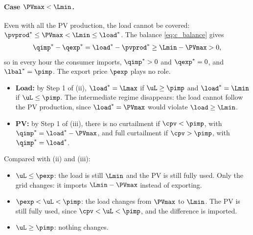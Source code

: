 \paragraph{Case $\PVmax < \Lmin$.}
Even with all the PV production, the load cannot be covered: ${\pvprod}^* \leq \PVmax < \Lmin
\leq {\load}^*$. The balance \eqref{eq:c_balance} gives
\begin{equation}
    {\qimp}^* - {\qexp}^* = {\load}^* - {\pvprod}^* \geq \Lmin - \PVmax > 0,
\end{equation}
so in every hour the consumer imports, ${\qimp}^* > 0$ and ${\qexp}^* = 0$, and
${\lbal}^* = \pimp$. The export price $\pexp$ plays no role.
\begin{itemize}
    \item \textbf{Load:} by Step 1 of (ii), ${\load}^* = \Lmax$ if $\uL \geq \pimp$ and
    ${\load}^* = \Lmin$ if $\uL \leq \pimp$. The intermediate regime disappears: the load
    cannot follow the PV production, since ${\load}^* = \PVmax$ would violate $\load \geq \Lmin$.
    \item \textbf{PV:} by Step 1 of (iii), there is no curtailment if $\cpv < \pimp$, with
    ${\qimp}^* = {\load}^* - \PVmax$, and full curtailment if $\cpv > \pimp$, with
    ${\qimp}^* = {\load}^*$.
\end{itemize}
Compared with (ii) and (iii):
\begin{itemize}
    \item $\uL \leq \pexp$: the load is still $\Lmin$ and the PV is still fully used. Only the
    grid changes: it imports $\Lmin - \PVmax$ instead of exporting.
    \item $\pexp < \uL < \pimp$: the load changes from $\PVmax$ to $\Lmin$. The PV is still
    fully used, since $\cpv < \uL < \pimp$, and the difference is imported.
    \item $\uL \geq \pimp$: nothing changes.
\end{itemize}

